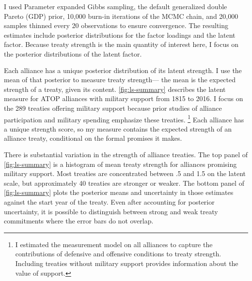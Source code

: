 \documentclass[12pt]{article}
\begin{document}
I used Parameter expanded Gibbs sampling, the default generalized double Pareto (GDP) prior, 10,000 burn-in iterations of the MCMC chain, and 20,000 samples thinned every 20 observations to ensure convergence. 
The resulting estimates include posterior distributions for the factor loadings and the latent factor. 
Because treaty strength is the main quantity of interest here, I focus on the posterior distributions of the latent factor. 


Each alliance has a unique posterior distribution of its latent strength. 
I use the mean of that posterior to measure treaty strength--- the mean is the expected strength of a treaty, given its content. 
\autoref{fig:ls-summary} describes the latent measure for ATOP alliances  with military support from 1815 to 2016.
I focus on the 289 treaties offering military support because prior studies of alliance participation and military spending emphasize these treaties.
\footnote{I estimated the measurement model on all alliances to capture the contributions of defensive and offensive conditions to treaty strength. Including treaties without military support provides information about the value of support.}
Each alliance has a unique strength score, so my measure contains the expected strength of an alliance treaty, conditional on the formal promises it makes. 


There is substantial variation in the strength of alliance treaties. 
The top panel of \autoref{fig:ls-summary} is a histogram of mean treaty strength for alliances promising military support. 
Most treaties are concentrated between .5 and 1.5 on the latent scale, but approximately 40 treaties are stronger or weaker. 
The bottom panel of \autoref{fig:ls-summary} plots the posterior means and uncertainty in those estimates against the start year of the treaty. 
Even after accounting for posterior uncertainty, it is possible to distinguish between strong and weak treaty commitments where the error bars do not overlap. 
\end{document}
